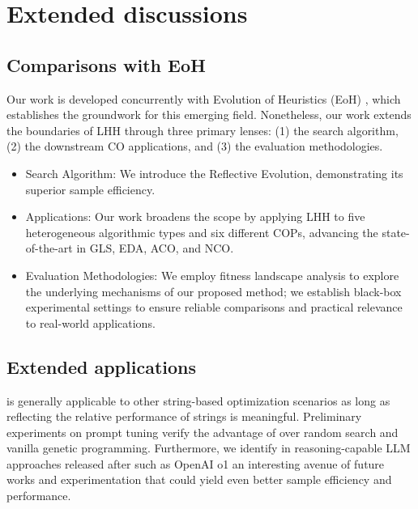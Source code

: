 \section{Extended discussions} \label{app: further discussions}

\subsection{Comparisons with EoH}\label{app: comparisons with eoh}
Our work is developed concurrently with Evolution of Heuristics (EoH) \cite{liu2024_llm_gls}, which establishes the groundwork for this emerging field. Nonetheless, our work extends the boundaries of LHH through three primary lenses: (1) the search algorithm, (2) the downstream CO applications, and (3) the evaluation methodologies.
\begin{itemize}[left=10pt]
    \item Search Algorithm: We introduce the Reflective Evolution, demonstrating its superior sample efficiency.
    \item Applications: Our work broadens the scope by applying LHH to five heterogeneous algorithmic types and six different COPs, advancing the state-of-the-art in GLS, EDA, ACO, and NCO.
    \item Evaluation Methodologies: We employ fitness landscape analysis to explore the underlying mechanisms of our proposed method; we establish black-box experimental settings to ensure reliable comparisons and practical relevance to real-world applications.
\end{itemize}


\subsection{Extended applications} \our{} is generally applicable to other string-based optimization scenarios \cite{meyerson2023lm_crossover} as long as reflecting the relative performance of strings is meaningful. Preliminary experiments on prompt tuning verify the advantage of \our{} over random search and vanilla genetic programming. Furthermore, we identify in reasoning-capable LLM approaches released after \our{} such as OpenAI o1 \citep{zhong2024evaluation} an interesting avenue of future works and experimentation that could yield even better sample efficiency and performance.
